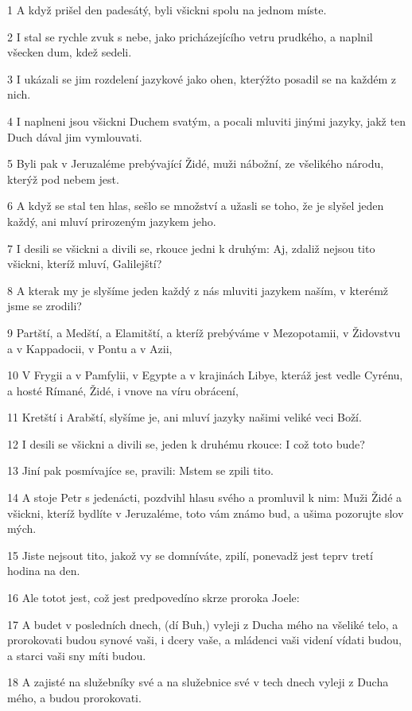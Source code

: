 \par 1 A když prišel den padesátý, byli všickni spolu na jednom míste.
\par 2 I stal se rychle zvuk s nebe, jako pricházejícího vetru prudkého, a naplnil všecken dum, kdež sedeli.
\par 3 I ukázali se jim rozdelení jazykové jako ohen, kterýžto posadil se na každém z nich.
\par 4 I naplneni jsou všickni Duchem svatým, a pocali mluviti jinými jazyky, jakž ten Duch dával jim vymlouvati.
\par 5 Byli pak v Jeruzaléme prebývající Židé, muži nábožní, ze všelikého národu, kterýž pod nebem jest.
\par 6 A když se stal ten hlas, sešlo se množství a užasli se toho, že je slyšel jeden každý, ani mluví prirozeným jazykem jeho.
\par 7 I desili se všickni a divili se, rkouce jedni k druhým: Aj, zdaliž nejsou tito všickni, kteríž mluví, Galilejští?
\par 8 A kterak my je slyšíme jeden každý z nás mluviti jazykem naším, v kterémž jsme se zrodili?
\par 9 Partští, a Medští, a Elamitští, a kteríž prebýváme v Mezopotamii, v Židovstvu a v Kappadocii, v Pontu a v Azii,
\par 10 V Frygii a v Pamfylii, v Egypte a v krajinách Libye, kteráž jest vedle Cyrénu, a hosté Rímané, Židé, i vnove na víru obrácení,
\par 11 Kretští i Arabští, slyšíme je, ani mluví jazyky našimi veliké veci Boží.
\par 12 I desili se všickni a divili se, jeden k druhému rkouce: I což toto bude?
\par 13 Jiní pak posmívajíce se, pravili: Mstem se zpili tito.
\par 14 A stoje Petr s jedenácti, pozdvihl hlasu svého a promluvil k nim: Muži Židé a všickni, kteríž bydlíte v Jeruzaléme, toto vám známo bud, a ušima pozorujte slov mých.
\par 15 Jiste nejsout tito, jakož vy se domníváte, zpilí, ponevadž jest teprv tretí hodina na den.
\par 16 Ale totot jest, což jest predpovedíno skrze proroka Joele:
\par 17 A budet v posledních dnech, (dí Buh,) vyleji z Ducha mého na všeliké telo, a prorokovati budou synové vaši, i dcery vaše, a mládenci vaši videní vídati budou, a starci vaši sny míti budou.
\par 18 A zajisté na služebníky své a na služebnice své v tech dnech vyleji z Ducha mého, a budou prorokovati.
